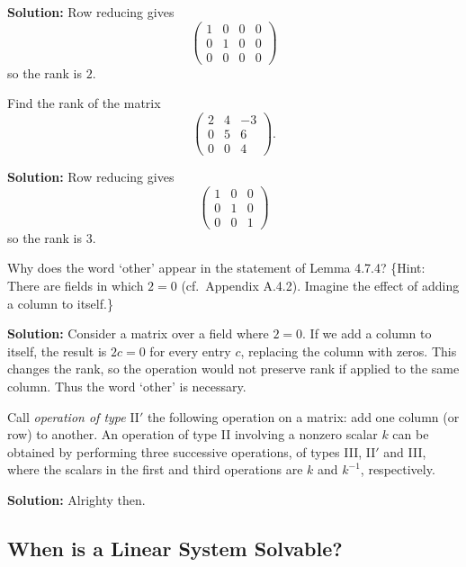\textbf{Solution:} Row reducing gives
\[
\begin{pmatrix}
    1 & 0 & 0 & 0 \\
    0 & 1 & 0 & 0 \\
    0 & 0 & 0 & 0
\end{pmatrix}
\]
so the rank is $2$.

\begin{tcolorbox}[title=Exercise 2, breakable]
    Find the rank of the matrix
    \[
    \begin{pmatrix}
        2 & 4 & -3 \\
        0 & 5 & 6 \\
        0 & 0 & 4
    \end{pmatrix}.
    \]
\end{tcolorbox}

\textbf{Solution:} Row reducing gives
\[
\begin{pmatrix}
    1 & 0 & 0 \\
    0 & 1 & 0 \\
    0 & 0 & 1
\end{pmatrix}
\]
so the rank is $3$.

\begin{tcolorbox}[title=Exercise 4, breakable]
    Why does the word `other' appear in the statement of Lemma 4.7.4?
    \{Hint: There are fields in which $2 = 0$ (cf.\ Appendix A.4.2).
    Imagine the effect of adding a column to itself.\}
\end{tcolorbox}

\textbf{Solution:} Consider a matrix over a field where $2 = 0$.
If we add a column to itself, the result is $2c = 0$ for every entry $c$, replacing the column with zeros.
This changes the rank, so the operation would not preserve rank if applied to the same column.
Thus the word `other' is necessary.

\begin{tcolorbox}[title=Exercise 5, breakable]
    Call \textit{operation of type} II$'$ the following operation on a matrix: add one column (or row) to another.
    An operation of type II involving a nonzero scalar $k$ can be obtained by performing three successive operations,
    of types III, II$'$ and III, where the scalars in the first and third operations are $k$ and $k^{-1}$, respectively.
\end{tcolorbox}

\textbf{Solution: } Alrighty then.

\subsection{When is a Linear System Solvable?}

